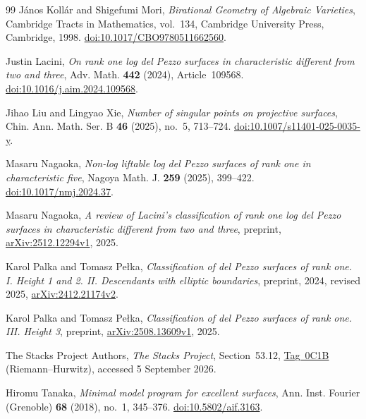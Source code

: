 \documentclass[11pt,reqno]{amsart}
\theoremstyle{definition}
\theoremstyle{remark}
\numberwithin{equation}{section}
\begin{document}
\begin{thebibliography}{99}
J\'anos Koll\'ar and Shigefumi Mori, \emph{Birational Geometry of Algebraic
Varieties}, Cambridge Tracts in Mathematics, vol.~134, Cambridge
University Press, Cambridge, 1998.
\href{https://doi.org/10.1017/CBO9780511662560}{doi:10.1017/CBO9780511662560}.

Justin Lacini, \emph{On rank one log del Pezzo surfaces in characteristic
different from two and three}, Adv. Math. \textbf{442} (2024),
Article~109568.
\href{https://doi.org/10.1016/j.aim.2024.109568}{doi:10.1016/j.aim.2024.109568}.

Jihao Liu and Lingyao Xie, \emph{Number of singular points on projective
surfaces}, Chin. Ann. Math. Ser. B \textbf{46} (2025), no.~5, 713--724.
\href{https://doi.org/10.1007/s11401-025-0035-y}{doi:10.1007/s11401-025-0035-y}.

Masaru Nagaoka, \emph{Non-log liftable log del Pezzo surfaces of rank one
in characteristic five}, Nagoya Math. J. \textbf{259} (2025), 399--422.
\href{https://doi.org/10.1017/nmj.2024.37}{doi:10.1017/nmj.2024.37}.

Masaru Nagaoka, \emph{A review of Lacini's classification of rank one log
del Pezzo surfaces in characteristic different from two and three},
preprint, \href{https://arxiv.org/abs/2512.12294v1}{arXiv:2512.12294v1},
2025.

Karol Palka and Tomasz Pe\l ka, \emph{Classification of del Pezzo
surfaces of rank one. I. Height 1 and 2. II. Descendants with elliptic
boundaries}, preprint, 2024, revised 2025,
\href{https://arxiv.org/abs/2412.21174v2}{arXiv:2412.21174v2}.

Karol Palka and Tomasz Pe\l ka, \emph{Classification of del Pezzo
surfaces of rank one. III. Height 3}, preprint,
\href{https://arxiv.org/abs/2508.13609v1}{arXiv:2508.13609v1}, 2025.

The Stacks Project Authors, \emph{The Stacks Project},
Section~53.12, \href{https://stacks.math.columbia.edu/tag/0C1B}{Tag~0C1B}
(Riemann--Hurwitz), accessed 5 September 2026.

Hiromu Tanaka, \emph{Minimal model program for excellent surfaces},
Ann. Inst. Fourier (Grenoble) \textbf{68} (2018), no.~1, 345--376.
\href{https://doi.org/10.5802/aif.3163}{doi:10.5802/aif.3163}.
\end{thebibliography}
\end{document}
